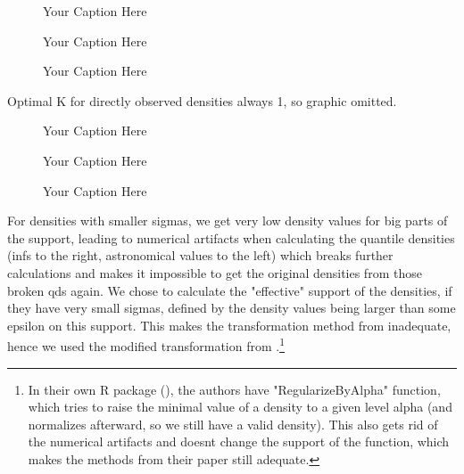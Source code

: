 \begin{figure}[h]
    \centering
    
    \caption{Your Caption Here}
    \label{fig:your_label}
\end{figure}

\begin{figure}[h]
    \centering
    
    \caption{Your Caption Here}
    \label{fig:your_label}
\end{figure}

\begin{figure}[h]
    \centering
    
    \caption{Your Caption Here}
    \label{fig:your_label}
\end{figure}

Optimal K for directly observed densities always 1, so graphic omitted.

\begin{figure}[h]
    \centering
    
    \caption{Your Caption Here}
    \label{fig:your_label}
\end{figure}

\begin{figure}[h]
    \centering
    
    \caption{Your Caption Here}
    \label{fig:your_label}
\end{figure}

\begin{figure}[h]
    \centering
    
    \caption{Your Caption Here}
    \label{fig:your_label}
\end{figure}

For densities with smaller sigmas, we get very low density values for big parts of the
support, leading to numerical artifacts when calculating the quantile densities (infs
to the right, astronomical values to the left) which breaks further calculations and
makes it impossible to get the original densities from those broken qds again. We chose
to calculate the "effective" support of the densities, if they have very small sigmas,
defined by the density values being larger than some epsilon on this support. This
makes the transformation method from \textcite{PetersenMüller2016} inadequate, hence we
used the modified transformation from \textcite{KokoszkaEtAl2019}.\footnote{In their own R
package (), the authors have "RegularizeByAlpha" function, which tries to raise the minimal
value of a density to a given level alpha (and normalizes afterward, so we still have a
valid density). This also gets rid of the numerical artifacts and doesnt change the
support of the function, which makes the methods from their paper still adequate.}

